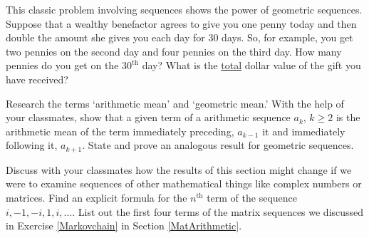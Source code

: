 \documentclass{ximera}
\begin{document}
\begin{problem}
    This classic problem involving sequences shows the power of geometric sequences.  Suppose that a wealthy benefactor agrees to give you one penny today and then double the amount she gives you each day for 30 days.  So, for example, you get two pennies on the second day and four pennies on the third day.  How many pennies do you get on the $30^{\mbox{th}}$ day?  What is the \underline{total} dollar value of the gift you have received?
\end{problem}

\begin{problem}
Research the terms `arithmetic mean' and `geometric mean.'  With the help of your classmates, show that a given term of a arithmetic sequence $a_{k}$, $k \geq 2$ is the arithmetic mean of the term immediately preceding, $a_{k-1}$ it and immediately following it, $a_{k+1}$.  State and prove an analogous result for geometric sequences.  
    
\end{problem}

\begin{problem}
    Discuss with your classmates how the results of this section might change if we were to examine sequences of other mathematical things like complex numbers or matrices.  Find an explicit formula for the $n^{\mbox{th}}$ term of the sequence $i, -1, -i, 1, i, \ldots$.  List out the first four terms of the matrix sequences we discussed in Exercise \ref{Markovchain} in Section \ref{MatArithmetic}.
\end{problem}
\end{document}
